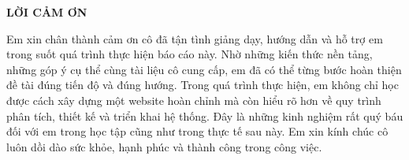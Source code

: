 \documentclass[../BTL.tex]{subfiles}
\begin{document}
\begin{center}
    \Large{\textbf{LỜI CẢM ƠN}}\\
\end{center}
\vspace{1cm}

Em xin chân thành cảm ơn cô đã tận tình giảng dạy, hướng dẫn và hỗ trợ em trong suốt quá trình thực hiện báo cáo này. Nhờ những kiến thức nền tảng, những góp ý cụ thể cùng tài liệu cô cung cấp, em đã có thể từng bước hoàn thiện đề tài đúng tiến độ và đúng hướng. Trong quá trình thực hiện, em không chỉ học được cách xây dựng một website hoàn chỉnh mà còn hiểu rõ hơn về quy trình phân tích, thiết kế và triển khai hệ thống. Đây là những kinh nghiệm rất quý báu đối với em trong học tập cũng như trong thực tế sau này. Em xin kính chúc cô luôn dồi dào sức khỏe, hạnh phúc và thành công trong công việc.
\end{document}
